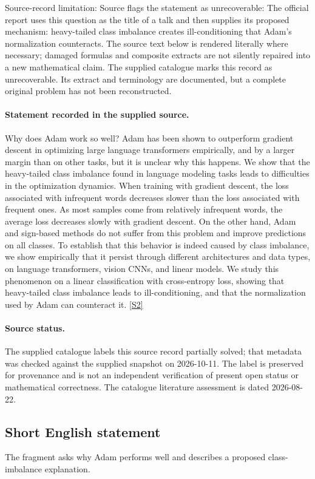 \documentclass[11pt]{article}
\begin{document}
Source-record limitation: Source flags the statement as unrecoverable: The official report uses this question as the title of a talk and then supplies its proposed mechanism: heavy-tailed class imbalance creates ill-conditioning that Adam’s normalization counteracts.
The source text below is rendered literally where necessary; damaged formulas and composite extracts are not silently repaired into a new mathematical claim.
The supplied catalogue marks this record as unrecoverable. Its extract and terminology are documented, but a complete original problem has not been reconstructed.
\paragraph{Statement recorded in the supplied source.}
Why does Adam work so well? Adam has been shown to outperform gradient descent in optimizing large language transformers empirically, and by a larger margin than on other tasks, but it is unclear why this happens. We show that the heavy-tailed class imbalance found in language modeling tasks leads to difficulties in the optimization dynamics. When training with gradient descent, the loss associated with infrequent words decreases slower than the loss associated with frequent ones. As most samples come from relatively infrequent words, the average loss decreases slowly with gradient descent. On the other hand, Adam and sign-based methods do not suffer from this problem and improve predictions on all classes. To establish that this behavior is indeed caused by class imbalance, we show empirically that it persist through different architectures and data types, on language transformers, vision CNNs, and linear models. We study this phenomenon on a linear classification with cross-entropy loss, showing that heavy-tailed class imbalance leads to ill-conditioning, and that the normalization used by Adam can counteract it. \href{https://doi.org/10.4171/owr/2025/4}{[S2]}
\paragraph{Source status.}
The supplied catalogue labels this source record partially solved; that metadata was checked against the supplied snapshot on 2026-10-11. The label is preserved for provenance and is not an independent verification of present open status or mathematical correctness. The catalogue literature assessment is dated 2026-08-22.
\subsection{Short English statement}
The fragment asks why Adam performs well and describes a proposed class-imbalance explanation.
\end{document}

